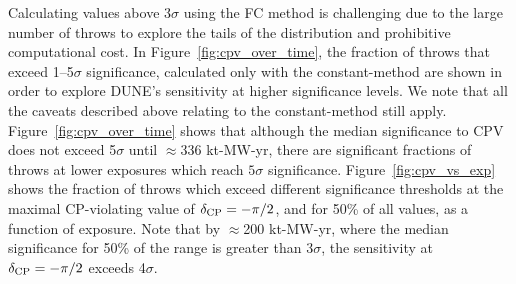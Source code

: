 Calculating \dchisqcrit values above 3$\sigma$ using the FC method is challenging due to the large number of throws to explore the tails of the \dchisqFC distribution and prohibitive computational cost. In Figure~\ref{fig:cpv_over_time}, the fraction of throws that exceed 1--5$\sigma$ significance, calculated only with the constant-\dchisq method are shown in order to explore DUNE's sensitivity at higher significance levels. We note that all the caveats described above relating to the constant-\dchisq method still apply. Figure~\ref{fig:cpv_over_time} shows that although the median significance to CPV does not exceed 5$\sigma$ until $\approx$336 kt-MW-yr, there are significant fractions of throws at lower exposures which reach $5\sigma$ significance. Figure~\ref{fig:cpv_vs_exp} shows the fraction of throws which exceed different significance thresholds at the maximal CP-violating value of $\delta_{\rm CP} = -\pi/2$, and for 50\% of all \deltacp values, as a function of exposure. Note that by $\approx$200 kt-MW-yr, where the median significance for 50\% of the \deltacp range is greater than 3$\sigma$, the sensitivity at $\delta_{\rm CP} = -\pi/2$ exceeds 4$\sigma$.

\FloatBarrier
